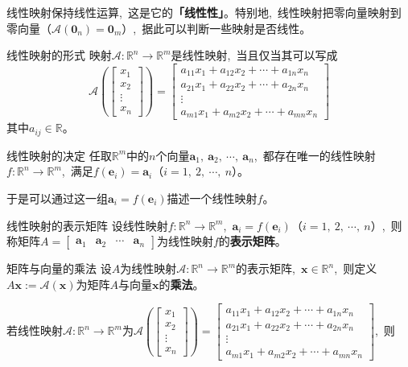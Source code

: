 \documentclass[10pt, a4paper, oneside, fontset=none]{ctexart}
\theoremstyle{plain}
\theoremstyle{definition}
\newcommand{\com}{,\,\,\,\:}
\newcommand{\de}[2][]{\begin{defil}{#1}\kai #2\end{defil}}
\newcommand{\di}[2][]{\begin{theo}{#1}\run #2\end{theo}}
\newcommand{\R}{\mathbb{R}}
\newcommand{\tboba}[1]{\textbf{\kai\color{bali!75!black}#1}}
\newcommand{\tbome}[1]{\textbf{\run\color{meihong!75!black}#1}}
\begin{document}
线性映射保持线性运算\com 这是它的\tbome{「线性性」}。特别地\com 线性映射把零向量映射到零向量（$\mathscr{A}(\boldsymbol{0}_n)=\boldsymbol{0}_m$）\com 据此可以判断一些映射是否线性。
\di[线性映射的形式]{
    映射$\mathscr{A }:\R^n\rightarrow\R^m$是线性映射\com 当且仅当其可以写成
    $$\mathscr{A }\left(\begin{bmatrix}
        x_1\\x_2\\\vdots\\x_n
    \end{bmatrix}\right)=\begin{bmatrix}
        a_{11}x_1+a_{12}x_2+\cdots+a_{1n}x_n\\
        a_{21}x_1+a_{22}x_2+\cdots+a_{2n}x_n\\
        \vdots\\
        a_{m1}x_1+a_{m2}x_2+\cdots+a_{mn}x_n
    \end{bmatrix}$$其中$a_{ij}\in \R$。
}
\di[线性映射的决定]{
    任取$\R^m$中的$n$个向量$\boldsymbol{a}_1,~\boldsymbol{a}_2,~\cdots,~\boldsymbol{a}_n$\com 都存在唯一的线性映射$f:\R^n\rightarrow\R^m$\com 满足$f(\boldsymbol{e}_i)=\boldsymbol{a}_i$（$i=1,~2,~\cdots,~n$）。
}
于是可以通过这一组$\boldsymbol{a}_i=f(\boldsymbol{e}_i)$描述一个线性映射$f$。
\de[线性映射的表示矩阵]{
    设线性映射$f:\R^n\rightarrow\R^m$\com $\boldsymbol{a}_i=f(\boldsymbol{e}_i)$（$i=1,~2,~\cdots,~n$）\com 则称矩阵$A=\left[\begin{array}{cccc}
        \boldsymbol{a}_1 & \boldsymbol{a}_2 & \cdots & \boldsymbol{a}_n 
    \end{array}\right]$为线性映射$f$的\tboba{表示矩阵}。
}
\de[矩阵与向量的乘法]{
    设$A$为线性映射$\mathscr{A}:\R^n\rightarrow\R^m$的表示矩阵\com $\boldsymbol{x}\in \R^n$\com 则定义$A\boldsymbol{x}:=\mathscr{A}(\boldsymbol{x})$为矩阵$A$与向量$\boldsymbol{x}$的\tboba{乘法}。
}
若线性映射$\mathscr{A}:\R^n\rightarrow\R^m$为$\mathscr{A }\left(\begin{bmatrix}
        x_1\\x_2\\\vdots\\x_n
    \end{bmatrix}\right)=\begin{bmatrix}
        a_{11}x_1+a_{12}x_2+\cdots+a_{1n}x_n\\
        a_{21}x_1+a_{22}x_2+\cdots+a_{2n}x_n\\
        \vdots\\
        a_{m1}x_1+a_{m2}x_2+\cdots+a_{mn}x_n
    \end{bmatrix}$\com 则
\end{document}
